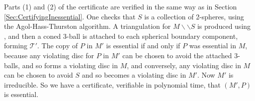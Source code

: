 \documentclass[oneside]{amsart}
\numberwithin{equation}{section}
\theoremstyle{plain}
\theoremstyle{definition}
\newcommand{\cut}{\backslash\backslash}
\begin{document}
Parts (1) and (2) of the certificate are verified in the same way as in Section \ref{Sec:CertifyingInessential}. One checks that $S$ is a collection of 2-spheres, using the
Agol-Hass-Thurston algorithm. A triangulation for $M \cut S$ is produced using \cite[Theorem 11.4]{Lackenby:EfficientCertification}, and then a coned 3-ball
is attached to each spherical boundary component, forming $\mathcal{T}'$. The copy of $P$ in $M'$ is essential if and only if $P$ was essential in $M$, because
any violating disc for $P$ in $M'$ can be chosen to avoid the attached 3-balls, and so forms a violating disc in $M$, and conversely, any violating disc in $M$ can be chosen to avoid $S$ and so becomes a violating disc in $M'$. Now $M'$ is irreducible. So we have a certificate, verifiable in polynomial time, that $(M',P)$ is essential.



\end{document}
